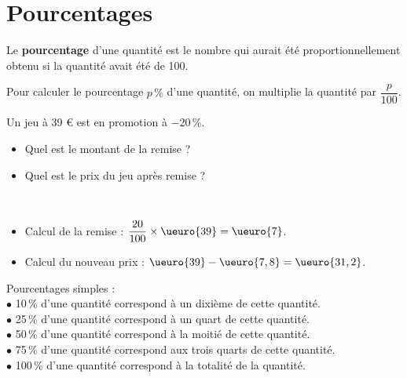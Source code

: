 \section{Pourcentages}

\begin{definition}
   Le {\bf pourcentage} d'une quantité est le nombre qui aurait été proportionnellement obtenu si la quantité avait été de 100.
\end{definition}

\begin{propriete}
   Pour calculer le pourcentage $p\,\%$ d'une quantité, on multiplie la quantité par $\dfrac{p}{100}$.
\end{propriete}

\begin{exemple}
   Un jeu à 39 \euro{} est en promotion à $-$20\,\%. 
   \begin{itemize}
      \item Quel est le montant de la remise ?
      \item Quel est le prix du jeu après remise ?
   \end{itemize}
   \correction
   \ \\ [-8mm]
   \begin{itemize}
      \item Calcul de la remise : $\dfrac{20}{100}\times\ueuro{39}=\ueuro{7}$. \medskip
      \item Calcul du nouveau prix : $\ueuro{39}-\ueuro{7,8} =\ueuro{31,2}$.
   \end{itemize}
\end{exemple}

\bigskip

Pourcentages simples : \\
$\bullet$ 10\,\% d'une quantité correspond à un dixième de cette quantité. \\
$\bullet$ 25\,\% d'une quantité correspond à un quart de cette quantité. \\
$\bullet$ 50\,\% d'une quantité correspond à la moitié de cette quantité. \\
$\bullet$ 75\,\% d'une quantité correspond aux trois quarts de cette quantité. \\
$\bullet$ 100\,\% d'une quantité correspond à la totalité de la quantité. \\

